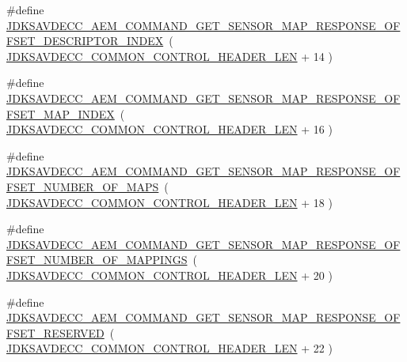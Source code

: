 \begin{DoxyCompactItemize}
\item 
\#define \hyperlink{group__command__get__sensor__map__response_gae28f52f2eb8b6d58c8291e1b208a3f79}{J\+D\+K\+S\+A\+V\+D\+E\+C\+C\+\_\+\+A\+E\+M\+\_\+\+C\+O\+M\+M\+A\+N\+D\+\_\+\+G\+E\+T\+\_\+\+S\+E\+N\+S\+O\+R\+\_\+\+M\+A\+P\+\_\+\+R\+E\+S\+P\+O\+N\+S\+E\+\_\+\+O\+F\+F\+S\+E\+T\+\_\+\+D\+E\+S\+C\+R\+I\+P\+T\+O\+R\+\_\+\+I\+N\+D\+EX}~( \hyperlink{group__jdksavdecc__avtp__common__control__header_gaae84052886fb1bb42f3bc5f85b741dff}{J\+D\+K\+S\+A\+V\+D\+E\+C\+C\+\_\+\+C\+O\+M\+M\+O\+N\+\_\+\+C\+O\+N\+T\+R\+O\+L\+\_\+\+H\+E\+A\+D\+E\+R\+\_\+\+L\+EN} + 14 )
\item 
\#define \hyperlink{group__command__get__sensor__map__response_gae0164c67af1e075715d147ec4a1f5558}{J\+D\+K\+S\+A\+V\+D\+E\+C\+C\+\_\+\+A\+E\+M\+\_\+\+C\+O\+M\+M\+A\+N\+D\+\_\+\+G\+E\+T\+\_\+\+S\+E\+N\+S\+O\+R\+\_\+\+M\+A\+P\+\_\+\+R\+E\+S\+P\+O\+N\+S\+E\+\_\+\+O\+F\+F\+S\+E\+T\+\_\+\+M\+A\+P\+\_\+\+I\+N\+D\+EX}~( \hyperlink{group__jdksavdecc__avtp__common__control__header_gaae84052886fb1bb42f3bc5f85b741dff}{J\+D\+K\+S\+A\+V\+D\+E\+C\+C\+\_\+\+C\+O\+M\+M\+O\+N\+\_\+\+C\+O\+N\+T\+R\+O\+L\+\_\+\+H\+E\+A\+D\+E\+R\+\_\+\+L\+EN} + 16 )
\item 
\#define \hyperlink{group__command__get__sensor__map__response_ga85f48d65315ddea09b64220b32387aca}{J\+D\+K\+S\+A\+V\+D\+E\+C\+C\+\_\+\+A\+E\+M\+\_\+\+C\+O\+M\+M\+A\+N\+D\+\_\+\+G\+E\+T\+\_\+\+S\+E\+N\+S\+O\+R\+\_\+\+M\+A\+P\+\_\+\+R\+E\+S\+P\+O\+N\+S\+E\+\_\+\+O\+F\+F\+S\+E\+T\+\_\+\+N\+U\+M\+B\+E\+R\+\_\+\+O\+F\+\_\+\+M\+A\+PS}~( \hyperlink{group__jdksavdecc__avtp__common__control__header_gaae84052886fb1bb42f3bc5f85b741dff}{J\+D\+K\+S\+A\+V\+D\+E\+C\+C\+\_\+\+C\+O\+M\+M\+O\+N\+\_\+\+C\+O\+N\+T\+R\+O\+L\+\_\+\+H\+E\+A\+D\+E\+R\+\_\+\+L\+EN} + 18 )
\item 
\#define \hyperlink{group__command__get__sensor__map__response_ga48cc0f2aa45cfe33d4313f1050c0c55e}{J\+D\+K\+S\+A\+V\+D\+E\+C\+C\+\_\+\+A\+E\+M\+\_\+\+C\+O\+M\+M\+A\+N\+D\+\_\+\+G\+E\+T\+\_\+\+S\+E\+N\+S\+O\+R\+\_\+\+M\+A\+P\+\_\+\+R\+E\+S\+P\+O\+N\+S\+E\+\_\+\+O\+F\+F\+S\+E\+T\+\_\+\+N\+U\+M\+B\+E\+R\+\_\+\+O\+F\+\_\+\+M\+A\+P\+P\+I\+N\+GS}~( \hyperlink{group__jdksavdecc__avtp__common__control__header_gaae84052886fb1bb42f3bc5f85b741dff}{J\+D\+K\+S\+A\+V\+D\+E\+C\+C\+\_\+\+C\+O\+M\+M\+O\+N\+\_\+\+C\+O\+N\+T\+R\+O\+L\+\_\+\+H\+E\+A\+D\+E\+R\+\_\+\+L\+EN} + 20 )
\item 
\#define \hyperlink{group__command__get__sensor__map__response_gab71a3bbde989d1191fc7ff32e5be58f3}{J\+D\+K\+S\+A\+V\+D\+E\+C\+C\+\_\+\+A\+E\+M\+\_\+\+C\+O\+M\+M\+A\+N\+D\+\_\+\+G\+E\+T\+\_\+\+S\+E\+N\+S\+O\+R\+\_\+\+M\+A\+P\+\_\+\+R\+E\+S\+P\+O\+N\+S\+E\+\_\+\+O\+F\+F\+S\+E\+T\+\_\+\+R\+E\+S\+E\+R\+V\+ED}~( \hyperlink{group__jdksavdecc__avtp__common__control__header_gaae84052886fb1bb42f3bc5f85b741dff}{J\+D\+K\+S\+A\+V\+D\+E\+C\+C\+\_\+\+C\+O\+M\+M\+O\+N\+\_\+\+C\+O\+N\+T\+R\+O\+L\+\_\+\+H\+E\+A\+D\+E\+R\+\_\+\+L\+EN} + 22 )

\end{DoxyCompactItemize}

